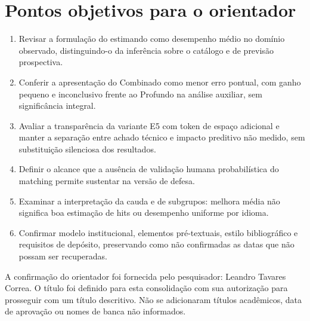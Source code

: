 \section{Pontos objetivos para o orientador}
\begin{enumerate}
\item Revisar a formulação do estimando como desempenho médio no domínio observado, distinguindo-o da inferência sobre o catálogo e de previsão prospectiva.
\item Conferir a apresentação do Combinado como menor erro pontual, com ganho pequeno e inconclusivo frente ao Profundo na análise auxiliar, sem significância integral.
\item Avaliar a transparência da variante E5 com token de espaço adicional e manter a separação entre achado técnico e impacto preditivo não medido, sem substituição silenciosa dos resultados.
\item Definir o alcance que a ausência de validação humana probabilística do matching permite sustentar na versão de defesa.
\item Examinar a interpretação da cauda e de subgrupos: melhora média não significa boa estimação de hits ou desempenho uniforme por idioma.
\item Confirmar modelo institucional, elementos pré-textuais, estilo bibliográfico e requisitos de depósito, preservando como não confirmadas as datas que não possam ser recuperadas.
\end{enumerate}

A confirmação do orientador foi fornecida pelo pesquisador: Leandro Tavares Correa. O título foi definido para esta consolidação com sua autorização para prosseguir com um título descritivo. Não se adicionaram títulos acadêmicos, data de aprovação ou nomes de banca não informados.

